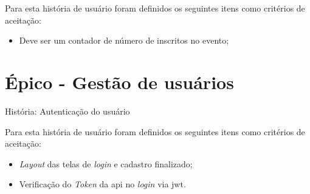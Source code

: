 Para esta história de usuário foram definidos os seguintes itens como critérios de aceitação:

\begin{itemize}
\item  Deve ser um contador de número de inscritos no evento;
\end{itemize}

\section{Épico - Gestão de usuários}
\label{gestão_usuario}
\def\arraystretch{2}
\begin{quadro}[htb]
\centering
\ABNTEXfontereduzida
\caption[História: Autenticação do usuário]{História: Autenticação do usuário}
\end{quadro}
\FloatBarrier 

Para esta história de usuário foram definidos os seguintes itens como critérios de aceitação:

\begin{itemize}
\item \textsl{Layout} das telas de \textsl{login} e cadastro finalizado;
\item Verificação do \textsl{Token} da \acs{api} no \textsl{login} via \acs{jwt}.
\end{itemize}

